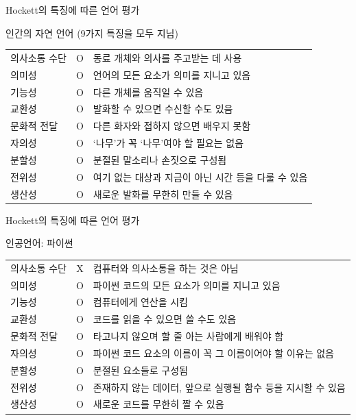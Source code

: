 \documentclass[11pt, aspectratio=169]{beamer}
\begin{document}
\begin{frame}[t]{Hockett의 특징에 따른 언어 평가}
  \begin{block}{인간의 자연 언어 (9가지 특징을 모두 지님)}    
    \begin{tabular}{lcl}
    의사소통 수단 & O & 동료 개체와 의사를 주고받는 데 사용\\
    의미성 & O & 언어의 모든 요소가 의미를 지니고 있음 \\
    기능성 & O & 다른 개체를 움직일 수 있음\\
    교환성 & O & 발화할 수 있으면 수신할 수도 있음\\
    문화적 전달 & O & 다른 화자와 접하지 않으면 배우지 못함 \\
    자의성 & O & ‘나무’가 꼭 ‘나무’여야 할 필요는 없음\\
    분할성 & O & 분절된 말소리나 손짓으로 구성됨\\
    전위성 & O & 여기 없는 대상과 지금이 아닌 시간 등을 다룰 수 있음\\
    생산성 & O & 새로운 발화를 무한히 만들 수 있음
    \end{tabular}
  \end{block}  
\end{frame}

\begin{frame}[t]{Hockett의 특징에 따른 언어 평가}
  \begin{block}{인공언어: 파이썬}
    \begin{tabular}{lcl}
    의사소통 수단 & X & 컴퓨터와 의사소통을 하는 것은 아님\\
    의미성 & O & 파이썬 코드의 모든 요소가 의미를 지니고 있음\\
    기능성 & O & 컴퓨터에게 연산을 시킴\\
    교환성 & O & 코드를 읽을 수 있으면 쓸 수도 있음\\
    문화적 전달 & O & 타고나지 않으며 할 줄 아는 사람에게 배워야 함\\
    자의성 & O & 파이썬 코드 요소의 이름이 꼭 그 이름이어야 할 이유는 없음\\
    분할성 & O & 분절된 요소들로 구성됨\\
    전위성 & O & 존재하지 않는 데이터, 앞으로 실행될 함수 등을 지시할 수 있음\\
    생산성 & O & 새로운 코드를 무한히 짤 수 있음
    \end{tabular}
  \end{block}
\end{frame}
\end{document}
